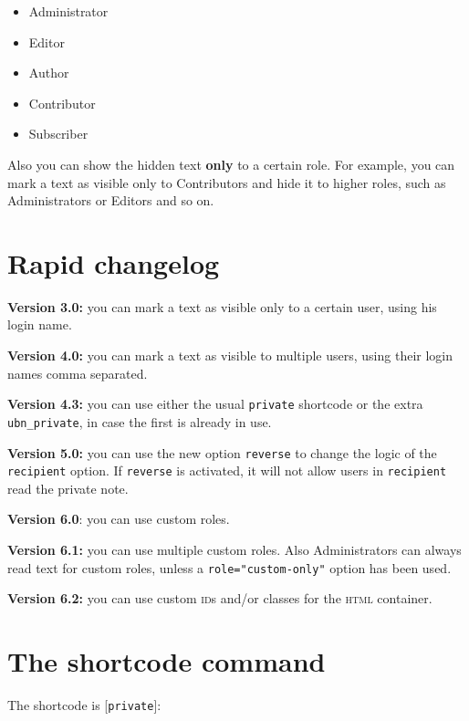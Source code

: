 \documentclass[a4paper,10pt]{article}
\begin{document}
\begin{itemize}
 \item Administrator
 \item Editor
 \item Author
 \item Contributor
 \item Subscriber
\end{itemize}

Also you can show the hidden text \textbf{only} to a certain role. For example, you can mark a text as visible only to Contributors and hide it to higher roles, such as Administrators or Editors and so on.

\section{Rapid changelog}

\begin{description}
 \item \textbf{Version 3.0:} you can mark a text as visible only to a certain user, using his login name.
 \item \textbf{Version 4.0:} you can mark a text as visible to multiple users, using their login names comma separated.
 \item \textbf{Version 4.3:} you can use either the usual \verb+private+ shortcode or the extra \verb+ubn_private+, in case the first is already in use.
 \item \textbf{Version 5.0:} you can use the new option \verb+reverse+ to change the logic of the \verb+recipient+ option. If \verb+reverse+ is activated, it will not allow users in \verb+recipient+ read the private note.
 \item \textbf{Version 6.0}: you can use custom roles.
 \item \textbf{Version 6.1:} you can use multiple custom roles. Also Administrators can always read text for custom roles, unless a \verb+role="custom-only"+ option has been used.
 \item \textbf{Version 6.2:} you can use custom \textsc{id}s and/or classes for the \textsc{html} container.
\end{description}

\section{The shortcode command}

The shortcode is [\verb+private+]:
\end{document}
